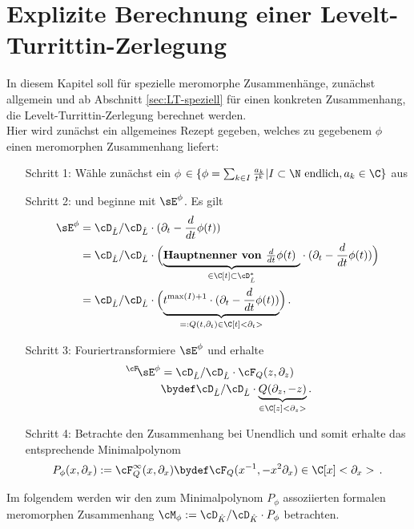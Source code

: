 \chapter{Explizite Berechnung einer Levelt-\!Turrittin-Zerlegung}
In diesem Kapitel soll für spezielle meromorphe Zusammenhänge, zunächst
allgemein und ab Abschnitt \ref{sec:LT-speziell} für einen konkreten
Zusammenhang, die Levelt-Turrittin-Zerlegung berechnet werden.\\
Hier wird zunächst ein allgemeines Rezept gegeben, welches zu gegebenem $\phi$
einen meromorphen Zusammenhang liefert:
\begin{enumerate}
\item[Schritt 1:] Wähle zunächst ein $\phi$
$\in\{\phi=\sum_{k\in I}\frac{a_k}{t^{k}}|I\subset\N\mbox{ endlich}
,a_k\in \C\}$
aus
\item[Schritt 2:] und beginne mit $\sE^{\phi}$. Es gilt
\begin{align*}
\sE^{\phi} &= \cD_{\hat L}/\cD_{\hat L}\cdot (\partial_t-\frac{d}{dt}\phi(t))
\\&=\cD_{\hat L}/\cD_{\hat L}\cdot \Big(\underset{\in\C[t]\subset\cD_{\hat L}^*}
    {\underbrace{\mbox{\textbf{Hauptnenner von $\frac{d}{dt}\phi(t)$ }}}}
  \cdot (\partial_t-\frac{d}{dt}\phi(t))\Big)
\\&=\cD_{\hat L}/\cD_{\hat L}\cdot \Big(
  \underset{=:Q(t,\partial_t) \in \C[t]<\partial_t> }{\underbrace{
  t^{\max(I)+1} \cdot (\partial_t-\frac{d}{dt}\phi(t))}}\Big) \,.
\end{align*}
\item[Schritt 3:] Fouriertransformiere $\sE^{\phi}$ und erhalte
\begin{align*}
\,^\cF\!\sE^{\phi}&=\cD_{\hat L}/\cD_{\hat L}\cdot{\cF_Q(z,\partial_z)}
\\&\bydef \cD_{\hat L}/\cD_{\hat L}\cdot
  \underset{\in\C[z]<\partial_z>}{\underbrace{Q(\partial_z,-z)}} \,.
\end{align*}
\item[Schritt 4:] Betrachte den Zusammenhang bei Unendlich und somit erhalte
das entsprechende Minimalpolynom
\[
P_\phi(x,\partial_x):= \cF_Q^\infty(x,\partial_x)
  \bydef \cF_Q(x^{-1},-x^2\partial_x) \in \C[x]<\partial_x> \,.
\]
\end{enumerate}
Im folgendem werden wir den zum Minimalpolynom $P_\phi$ assoziierten formalen
meromorphen Zusammenhang $\cM_\phi:=\cD_{\hat K}/\cD_{\hat K}\cdot P_{\phi}$
betrachten.
\begin{comment}
Im laufe des Kapitels werden dazu immer speziellere $\phi$
betrachtet und zuletzt wird für ein konkretes Beispiel eine explizite Rechnung
gegeben.
\end{comment}

